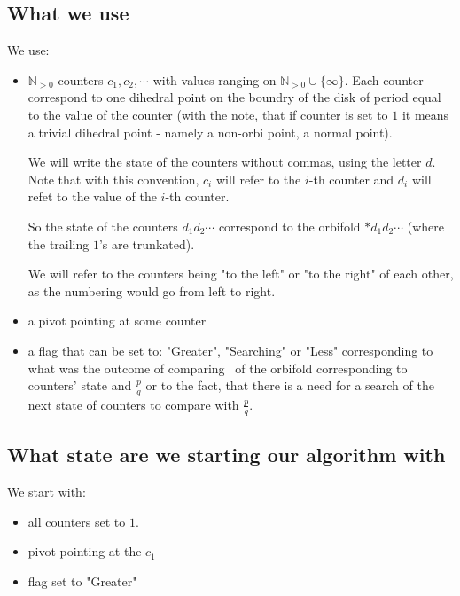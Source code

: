 \subsection{What we use}
We use: 
\begin{itemize}
\item $\mathbb{N}_{>0}$ counters $c_1, c_2, \cdots$ 
with values ranging on $\mathbb{N}_{>0}\cup\{\infty\}$.
Each counter correspond to one dihedral point 
on the boundry of the disk of period equal to the value of the counter (with the note, that 
if counter is set to $1$ it means a trivial dihedral point - namely a non-orbi point, 
a normal point). 

We will write the state of the counters without commas, using the letter $d$. 
Note that with this convention, $c_i$ will refer to the $i$-th counter and $d_i$ will 
refet to the value of the $i$-th counter. 

So the state of the counters $d_1d_2\cdots$ correspond to the orbifold 
$*d_1d_2\cdots$ (where the trailing $1$'s are trunkated).

We will refer to the counters being "to the left" or "to the right" of each other, as 
the numbering would go from left to right.

\item a pivot pointing at some counter 
\item a flag that can be set to: "Greater", "Searching" or "Less" corresponding to what was 
the outcome of comparing \Eoc\ of the orbifold corresponding to counters' state and 
$\frac{p}{q}$ or to the fact, that there is a need for a search of the next state of counters 
to compare with $\frac{p}{q}$.  
\end{itemize}
\subsection{What state are we starting our algorithm with}
We start with:
\begin{itemize}
\item all counters set to $1$. 
\item pivot pointing at the $c_1$
\item flag set to "Greater"
\end{itemize}
